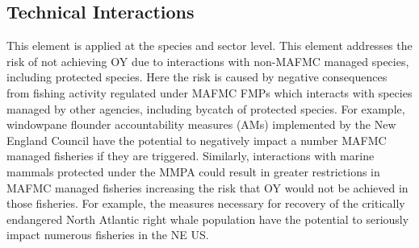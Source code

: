 \documentclass[11pt,]{article}
\begin{document}
\subsection{Technical Interactions}\label{technical-interactions}

This element is applied at the species and sector level. This element
addresses the risk of not achieving OY due to interactions with
non-MAFMC managed species, including protected species. Here the risk is
caused by negative consequences from fishing activity regulated under
MAFMC FMPs which interacts with species managed by other agencies,
including bycatch of protected species. For example, windowpane flounder
accountability measures (AMs) implemented by the New England Council
have the potential to negatively impact a number MAFMC managed fisheries
if they are triggered. Similarly, interactions with marine mammals
protected under the MMPA could result in greater restrictions in MAFMC
managed fisheries increasing the risk that OY would not be achieved in
those fisheries. For example, the measures necessary for recovery of the
critically endangered North Atlantic right whale population have the
potential to seriously impact numerous fisheries in the NE US.
\end{document}
